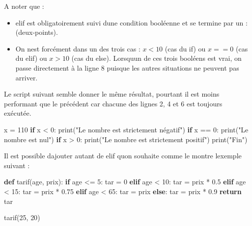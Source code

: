 \documentclass[
  paper=a4,
  ,captions=tableheading
]{scrartcl}
\newenvironment{Shaded}{}{}
\newcommand{\BuiltInTok}[1]{\textcolor[rgb]{0.00,0.50,0.00}{#1}}
\newcommand{\ControlFlowTok}[1]{\textcolor[rgb]{0.00,0.44,0.13}{\textbf{#1}}}
\newcommand{\DecValTok}[1]{\textcolor[rgb]{0.25,0.63,0.44}{#1}}
\newcommand{\FloatTok}[1]{\textcolor[rgb]{0.25,0.63,0.44}{#1}}
\newcommand{\KeywordTok}[1]{\textcolor[rgb]{0.00,0.44,0.13}{\textbf{#1}}}
\newcommand{\NormalTok}[1]{#1}
\newcommand{\OperatorTok}[1]{\textcolor[rgb]{0.40,0.40,0.40}{#1}}
\newcommand{\StringTok}[1]{\textcolor[rgb]{0.25,0.44,0.63}{#1}}
\providecommand{\tightlist}{%
  \setlength{\itemsep}{0pt}\setlength{\parskip}{0pt}}
\begin{document}
A noter que :

\begin{itemize}
\tightlist
\item
  elif est obligatoirement suivi d\textquotesingle une condition
  booléenne et se termine par un : (deux-points).
\item
  On n\textquotesingle est forcément dans un des trois cas : \(x<10\)
  (cas du if) ou \(x==0\) (cas du elif) ou \(x>10\) (cas du else).
  Lorsqu\textquotesingle un de ces trois booléens est vrai, on passe
  directement à la ligne 8 puisque les autres situations ne peuvent pas
  arriver.
\end{itemize}

Le script suivant semble donner le même résultat, pourtant il est moins
performant que le précédent car chacune des lignes 2, 4 et 6 est
toujours exécutée.

\begin{Shaded}
\begin{Highlighting}[]
\NormalTok{x }\OperatorTok{=} \DecValTok{110}
\ControlFlowTok{if}\NormalTok{ x }\OperatorTok{\textless{}} \DecValTok{0}\NormalTok{:}
    \BuiltInTok{print}\NormalTok{(}\StringTok{"Le nombre est strictement négatif"}\NormalTok{)}
\ControlFlowTok{if}\NormalTok{ x }\OperatorTok{==} \DecValTok{0}\NormalTok{:}
    \BuiltInTok{print}\NormalTok{(}\StringTok{"Le nombre est nul"}\NormalTok{)}
\ControlFlowTok{if}\NormalTok{ x }\OperatorTok{\textgreater{}} \DecValTok{0}\NormalTok{:}
    \BuiltInTok{print}\NormalTok{(}\StringTok{"Le nombre est strictement positif"}\NormalTok{)}
\BuiltInTok{print}\NormalTok{(}\StringTok{"Fin"}\NormalTok{)}
\end{Highlighting}
\end{Shaded}

Il est possible d\textquotesingle ajouter autant de elif
qu\textquotesingle on souhaite comme le montre l\textquotesingle exemple
suivant :

\begin{Shaded}
\begin{Highlighting}[]
\KeywordTok{def}\NormalTok{ tarif(age, prix):}
    \ControlFlowTok{if}\NormalTok{ age }\OperatorTok{\textless{}=} \DecValTok{5}\NormalTok{:}
\NormalTok{        tar }\OperatorTok{=} \DecValTok{0}
    \ControlFlowTok{elif}\NormalTok{ age }\OperatorTok{\textless{}} \DecValTok{10}\NormalTok{:}
\NormalTok{        tar }\OperatorTok{=}\NormalTok{ prix }\OperatorTok{*} \FloatTok{0.5}
    \ControlFlowTok{elif}\NormalTok{ age }\OperatorTok{\textless{}} \DecValTok{15}\NormalTok{:}
\NormalTok{        tar }\OperatorTok{=}\NormalTok{ prix }\OperatorTok{*} \FloatTok{0.75}
    \ControlFlowTok{elif}\NormalTok{ age }\OperatorTok{\textless{}} \DecValTok{65}\NormalTok{:}
\NormalTok{        tar }\OperatorTok{=}\NormalTok{ prix}
    \ControlFlowTok{else}\NormalTok{:}
\NormalTok{        tar }\OperatorTok{=}\NormalTok{ prix }\OperatorTok{*} \FloatTok{0.9}
    \ControlFlowTok{return}\NormalTok{ tar}


\NormalTok{tarif(}\DecValTok{25}\NormalTok{, }\DecValTok{20}\NormalTok{)}
\end{Highlighting}
\end{Shaded}
\end{document}
